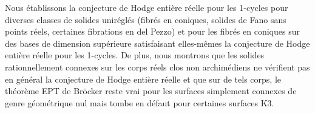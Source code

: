\documentclass[JEP,XML,SOM,Unicode]{cedram}
\theoremstyle{plain}
\theoremstyle{definition}
\numberwithin{equation}{section}
\begin{document}
\begin{altabstract}
Nous établissons la conjecture de Hodge entière réelle pour les 1-cycles pour diverses classes de solides uniréglés (fibrés en coniques, solides de Fano sans points réels, certaines fibrations en del Pezzo) et pour les fibrés en coniques sur des bases de dimension supérieure satisfaisant elles-mêmes la conjecture de Hodge entière réelle pour les 1-cycles. De plus, nous montrons que les solides rationnellement connexes sur les corps réels clos non archimédiens ne vérifient pas en général la conjecture de Hodge entière réelle et que sur de tels corps, le théorème EPT de Bröcker reste vrai pour les surfaces simplement connexes de genre géométrique nul mais tombe en défaut pour certaines surfaces K3.
\end{altabstract}
\maketitle
\vspace*{-\baselineskip}
\tableofcontents
\mainmatter
\setcounter{section}{5}
\end{document}
